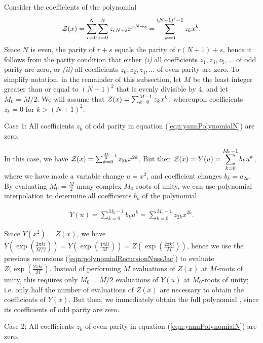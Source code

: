 Consider the coefficients of the polynomial
\begin{align}
\label{eqn:yannPolynomialN}
\emZ{} = \sum_{r=0}^{N} \sum_{s=0}^{N} z_{rN+s} x^{rN+s}
= \sum_{k=0}^{(N+1)^2-1} z_k x^k.
\end{align}
Since $N$ is even, the parity of $r+s$ equals the parity of
$r(N+1)+s$, hence  it follows from the parity condition that either
{\em (i)} all coefficients $z_1,z_3,z_5,\dots$ of odd parity are zero,
or {\em (ii)} all coefficients $z_0,z_2,z_4,\dots$ of even parity are zero.
To simplify notation, in the remainder of this subsection, let $M$ be
the least integer greater than or equal to $(N+1)^2$ that is evenly divisible
by $4$, and let $M_0=M/2$. We will assume that ${\mathcal Z}_{}(x) = \sum_{k=0}^{M-1}
z_k x^k$, whereupon coefficients $z_k=0$ for $k>(N+1)^2$.
\smallskip

\noindent
{\sc Case 1}: All coefficients $z_k$ of odd parity in
equation (\ref{eqn:yannPolynomialN}) are zero.
\smallskip

\noindent
In this case, we have
${\mathcal Z}_{}(x) = \sum_{k=0}^{\frac{M}{2}-1} z_{2k} x^{2k}$. But then
${\mathcal Z}_{}(x) = Y(u) = \displaystyle\sum_{k=0}^{M_0-1} b_k u^k$,
where we have made a variable change $u=x^2$, and coefficient changes
$b_k = a_{2k}$.
By evaluating $M_0=\frac{M}{2}$ many complex
$M_0$-roots of unity, we can
use polynomial interpolation to determine all coefficients $b_k$ of
the polynomial

\begin{align}
Y(u) = \displaystyle\sum_{k=0}^{M_0-1} b_k u^k =
\displaystyle\sum_{k=0}^{M_0-1} z_{2k} x^{2k}.
\end{align}


Since $Y(x^2)=Z(x)$, we have
$Y(\exp(\frac{2\pi k i}{M/2})) =
Y(\exp(\frac{4\pi k i}{M})) =
Z(\exp(\frac{2\pi k i}{M}))$, hence we
use the previous recursions (\ref{eqn:polynomialRecursionNussJac})
to evaluate $Z(\exp(\frac{2\pi ki}{M})$.  Instead of
performing $M$ evaluations of $Z(x)$ at $M$-roots of unity,
this requires only $M_0=M/2$ evaluations of $Y(u)$ at
$M_0$-roots of unity; i.e. only half the number of
evaluations of $Z(x)$ are necessary to
obtain the coefficients of $Y(x)$. But then, we immediately obtain the
full polynomial \emZ{}, since its coefficients of odd  parity are zero.
\medskip

\noindent
{\sc Case 2}: All coefficients $z_k$ of even parity in
equation (\ref{eqn:yannPolynomialN}) are zero.
\smallskip


